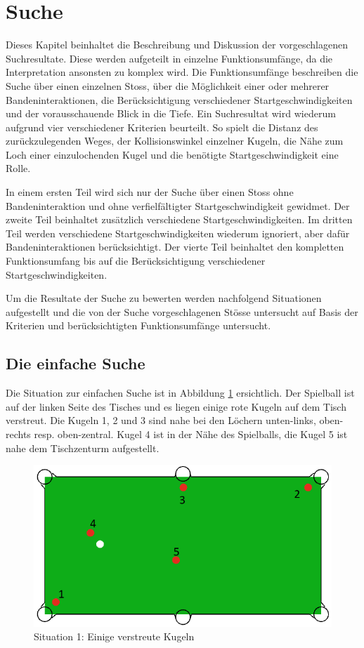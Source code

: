 \section{Suche}
Dieses Kapitel beinhaltet die Beschreibung und Diskussion der vorgeschlagenen Suchresultate. Diese werden aufgeteilt
in einzelne Funktionsumfänge, da die Interpretation ansonsten zu komplex wird. Die Funktionsumfänge beschreiben die Suche
über einen einzelnen Stoss, über die Möglichkeit einer oder mehrerer Bandeninteraktionen, die Berücksichtigung verschiedener
Startgeschwindigkeiten und der vorausschauende Blick in die Tiefe.
Ein Suchresultat wird wiederum aufgrund vier verschiedener
Kriterien beurteilt. So spielt die Distanz des zurückzulegenden Weges, der Kollisionswinkel einzelner Kugeln, die Nähe
zum Loch einer einzulochenden Kugel und die benötigte Startgeschwindigkeit eine Rolle.

In einem ersten Teil wird sich nur der Suche über einen Stoss ohne Bandeninteraktion und ohne
verfielfältigter Startgeschwindigkeit gewidmet. Der zweite Teil beinhaltet zusätzlich verschiedene Startgeschwindigkeiten.
Im dritten Teil werden verschiedene Startgeschwindigkeiten wiederum ignoriert, aber dafür Bandeninteraktionen berücksichtigt.
Der vierte Teil beinhaltet den kompletten Funktionsumfang bis auf die Berücksichtigung verschiedener Startgeschwindigkeiten.

Um die Resultate der Suche zu bewerten werden nachfolgend Situationen aufgestellt und die von der Suche
vorgeschlagenen Stösse untersucht auf Basis der Kriterien und berücksichtigten Funktionsumfänge untersucht.

\subsection{Die einfache Suche}\label{kap:suche:die_einfache_suche}
Die Situation zur einfachen Suche ist in Abbildung \ref{fig:search_situation_1} ersichtlich.
Der Spielball ist auf der linken Seite des Tisches und es liegen einige rote Kugeln auf dem Tisch verstreut.
Die Kugeln 1, 2 und 3 sind nahe bei den Löchern unten-links, oben-rechts resp. oben-zentral.
Kugel 4 ist in der Nähe des Spielballs, die Kugel 5 ist nahe dem Tischzenturm aufgestellt.

%
%
\begin{figure}[h!]
    \begin{center}
        \includegraphics[width=0.4\linewidth]{../common/04_results/resources/simple_search/situation_diverse.PNG}
    \end{center}
    \caption{Situation 1: Einige verstreute Kugeln}
    \label{fig:search_situation_1}
\end{figure}

